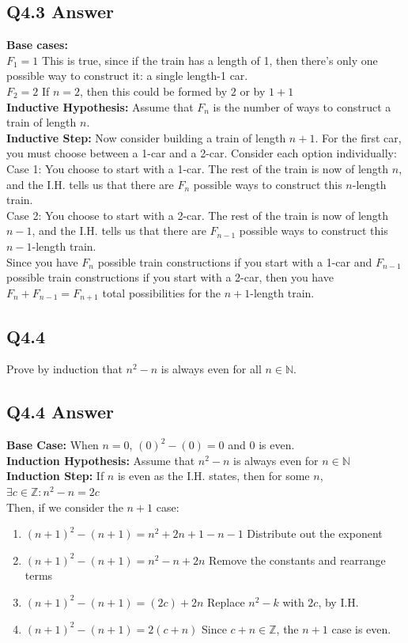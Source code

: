 \documentclass{article}
\begin{document}
\subsection*{Q4.3 Answer}
\textbf{Base cases:}
\\ $F_1=1$ This is true, since if the train has a length of 1, then there's only one possible way to construct it: a single length-1 car.
\\ $F_2=2$ If $n=2$, then this could be formed by $2$ or by $1+1$
\\ \textbf{Inductive Hypothesis:} Assume that $F_n$ is the number of ways to construct a train of length $n$.
\\ \textbf{Inductive Step:} Now consider building a train of length $n+1$. For the first car, you must choose between a 1-car and a 2-car. Consider each option individually:
\\ Case 1: You choose to start with a 1-car. The rest of the train is now of length $n$, and the I.H. tells us that there are $F_n$ possible ways to construct this $n$-length train.
\\ Case 2: You choose to start with a 2-car. The rest of the train is now of length $n-1$, and the I.H. tells us that there are $F_{n-1}$ possible ways to construct this $n-1$-length train.
\\ Since you have $F_n$ possible train constructions if you start with a 1-car and $F_{n-1}$ possible train constructions if you start with a 2-car, then you have $F_n+F_{n-1}=F_{n+1}$ total possibilities for the $n+1$-length train.
\newpage

\subsection*{Q4.4}
Prove by induction that $n^2-n$ is always even for all $n\in\mathbb{N}$.
\newpage
\subsection*{Q4.4 Answer}
\textbf{Base Case:} When $n=0$, $(0)^2-(0)=0$ and 0 is even.
\\ \textbf{Induction Hypothesis:} Assume that $n^2-n$ is always even for $n\in\mathbb{N}$
\\ \textbf{Induction Step:} If $n$ is even as the I.H. states, then for some $n$, $\exists c\in\mathbb{Z}:n^2-n=2c$
\\ Then, if we consider the $n+1$ case:
\begin{enumerate}[label=]
\item $(n+1)^2-(n+1) = n^2+2n+1-n-1$ Distribute out the exponent
\item $(n+1)^2-(n+1) = n^2-n+2n$ Remove the constants and rearrange terms
 \item $(n+1)^2-(n+1) = (2c)+2n$ Replace $n^2-k$ with $2c$, by I.H.
  \item $(n+1)^2-(n+1) = 2(c+n)$ Since $c+n\in\mathbb{Z}$, the $n+1$ case is even.
\end{enumerate}
\newpage
\end{document}

